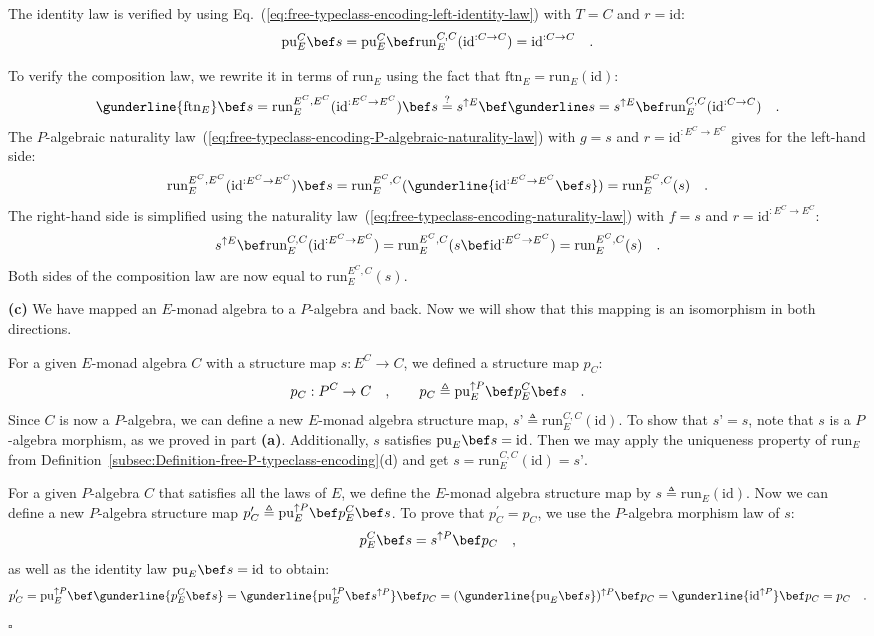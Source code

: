 The identity law is verified by using Eq.~(\ref{eq:free-typeclass-encoding-left-identity-law})
with $T=C$ and $r=\text{id}$:
\[
\text{pu}_{E}^{C}\bef s=\text{pu}_{E}^{C}\bef\text{run}_{E}^{C,C}(\text{id}^{:C\rightarrow C})=\text{id}^{:C\rightarrow C}\quad.
\]

To verify the composition law, we rewrite it in terms of $\text{run}_{E}$
using the fact that $\text{ftn}_{E}=\text{run}_{E}(\text{id})$:
\[
\gunderline{\text{ftn}_{E}}\bef s=\text{run}_{E}^{E^{C},E^{C}}(\text{id}^{:E^{C}\rightarrow E^{C}})\bef s\overset{?}{=}s^{\uparrow E}\bef\gunderline s=s^{\uparrow E}\bef\text{run}_{E}^{C,C}(\text{id}^{:C\rightarrow C})\quad.
\]
The $P$-algebraic naturality law~(\ref{eq:free-typeclass-encoding-P-algebraic-naturality-law})
with $g=s$ and $r=\text{id}^{:E^{C}\rightarrow E^{C}}$ gives for
the left-hand side:
\[
\text{run}_{E}^{E^{C},E^{C}}(\text{id}^{:E^{C}\rightarrow E^{C}})\bef s=\text{run}_{E}^{E^{C},C}(\gunderline{\text{id}^{:E^{C}\rightarrow E^{C}}\bef s})=\text{run}_{E}^{E^{C},C}(s)\quad.
\]
The right-hand side is simplified using the naturality law~(\ref{eq:free-typeclass-encoding-naturality-law})
with $f=s$ and $r=\text{id}^{:E^{C}\rightarrow E^{C}}$:
\[
s^{\uparrow E}\bef\text{run}_{E}^{C,C}(\text{id}^{:E^{C}\rightarrow E^{C}})=\text{run}_{E}^{E^{C},C}(s\bef\text{id}^{:E^{C}\rightarrow E^{C}})=\text{run}_{E}^{E^{C},C}(s)\quad.
\]
Both sides of the composition law are now equal to $\text{run}_{E}^{E^{C},C}(s)$.

\textbf{(c)} We have mapped an $E$-monad algebra to a $P$-algebra
and back. Now we will show that this mapping is an isomorphism in
both directions.

For a given $E$-monad algebra $C$ with a structure map $s:E^{C}\rightarrow C$,
we defined a structure map $p_{C}$:
\[
p_{C}:P^{C}\rightarrow C\quad,\quad\quad p_{C}\triangleq\text{pu}_{E}^{\uparrow P}\bef p_{E}^{C}\bef s\quad.
\]
Since $C$ is now a $P$-algebra, we can define a new $E$-monad algebra
structure map, $s\textsf{'}\triangleq\text{run}_{E}^{C,C}(\text{id})$. To
show that $s\textsf{'}=s$, note that $s$ is a $P$-algebra morphism, as we
proved in part \textbf{(a)}. Additionally, $s$ satisfies $\text{pu}_{E}\bef s=\text{id}$.
Then we may apply the uniqueness property of $\text{run}_{E}$ from
Definition~\ref{subsec:Definition-free-P-typeclass-encoding}(d)
and get $s=\text{run}_{E}^{C,C}(\text{id})=s\textsf{'}$.

For a given $P$-algebra $C$ that satisfies all the laws of $E$,
we define the $E$-monad algebra structure map by $s\triangleq\text{run}_{E}(\text{id})$.
Now we can define a new $P$-algebra structure map $p_{C}^{\prime}\triangleq\text{pu}_{E}^{\uparrow P}\bef p_{E}^{C}\bef s$.
To prove that $p_{C}^{\prime}=p_{C}$, we use the $P$-algebra morphism
law of $s$:
\[
p_{E}^{C}\bef s=s^{\uparrow P}\bef p_{C}\quad,
\]
as well as the identity law $\text{pu}_{E}\bef s=\text{id}$ to obtain:
\[
p_{C}^{\prime}=\text{pu}_{E}^{\uparrow P}\bef\gunderline{p_{E}^{C}\bef s}=\gunderline{\text{pu}_{E}^{\uparrow P}\bef s^{\uparrow P}}\bef p_{C}=(\gunderline{\text{pu}_{E}\bef s})^{\uparrow P}\bef p_{C}=\gunderline{\text{id}^{\uparrow P}}\bef p_{C}=p_{C}\quad.
\]
$\square$


